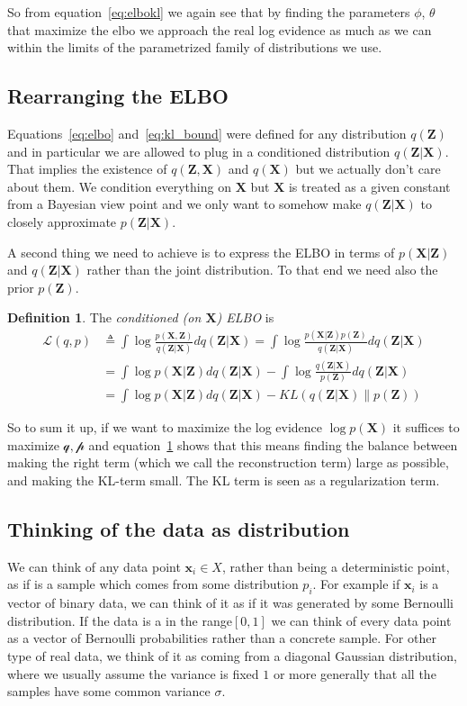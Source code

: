 \documentclass[11pt, a4paper]{report}
\theoremstyle{plain}
\theoremstyle{definition}
\newtheorem{mydef}{Definition}[chapter]
\theoremstyle{remark}
\newcommand{\X}{\mathbf{X}}
\newcommand{\x}{\mathbf{x}}
\newcommand{\Z}{\mathbf{Z}}
\begin{document}
So from equation~\ref{eq:elbokl} we again see that by finding the parameters
$\phi$, $\theta$ that maximize the elbo we approach the real log evidence as much
as we can within the limits of the parametrized family of distributions we use.

\subsection{Rearranging the ELBO}
Equations~\ref{eq:elbo} and~\ref{eq:kl_bound} were defined for any distribution
$q(\Z)$ and in particular we are allowed to plug in a conditioned
distribution $q(\Z|\X)$. That implies the existence of $q(\Z,\X)$ and $q(\X)$
but we actually don't care about them. We condition everything on $\X$ but $\X$
is treated as a given constant from a Bayesian view point and we only want to
somehow make $q(\Z|\X)$ to closely approximate $p(\Z | \X)$.

A second thing we need to achieve is to express the ELBO in terms of $p(\X|\Z)$
and $q(\Z|\X)$ rather than the joint distribution. To that end we need also the
prior $p(\Z)$.

\begin{mydef}
\label{eq:elbo_conditioned}
The \emph{conditioned (on $\X$) ELBO} is
\begin{equation}
\begin{aligned}
\mathcal{L}(q,p) &\triangleq \int \log \frac{p(\X,\Z)}{q(\Z|\X)}dq(\Z|\X) 
= \int \log \frac{p(\X |\Z) p(\Z)}{q(\Z|\X)}dq(\Z|\X) \\
&= \int \log p(\X | \Z)dq(\Z|\X) - \int \log \frac{q(\Z|\X)}{p(\Z)}dq(\Z|\X) \\
&= \int \log p(\X | \Z)dq(\Z|\X) - KL(q(\Z|\X) \| p(\Z))
\end{aligned}
\end{equation}
\end{mydef}

So to sum it up, if we want to maximize the log evidence $\log p(\X)$ it
suffices to maximize $\mathcal{q,p}$ and equation~\ref{eq:elbo_conditioned}
shows that this means finding the balance between making 
the right term (which we call the reconstruction term) large as possible, 
and making the KL-term small.
The KL term is seen as a regularization term.

\subsection{Thinking of the data as distribution}
We can think of any data point $\x_i \in X$, rather than being a deterministic
point, as if is a sample which comes from some distribution $p_i$.
For example if $\x_i$ is a vector of binary data, we can think of it as if it
was generated by some Bernoulli distribution. If the data is a in the
range$[0,1]$ we can think of every data point as a vector of Bernoulli 
probabilities rather than a concrete sample.
For other type of real data, we think of it as coming from a diagonal Gaussian
distribution, where we usually assume the variance is fixed $1$ or more 
generally that all the samples have some common variance $\sigma$.
\end{document}
